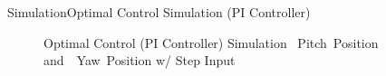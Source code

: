 \documentclass{beamer}
\begin{document}
\begin{frame}{Simulation}{Optimal Control Simulation (PI Controller)}
    \begin{figure}
      \centering
      \caption{Optimal Control (PI Controller) Simulation ~Pitch~Position and~~Yaw~Position w/ Step Input}
      \label{fig:LQR_PI_Sim_pos}
    \end{figure}
\end{frame}
\end{document}
